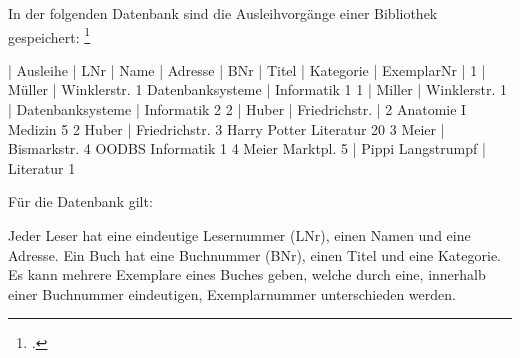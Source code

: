 \documentclass{bschlangaul-aufgabe}
\begin{document}

\let\ah=\bAttributHuelle
\let\ahL=\bLinksReduktion
\let\FA=\bFunktionaleAbhaengigkeiten
\let\fa=\bFunktionaleAbhaengigkeit
\let\m=\bAttributMenge
\let\schrittE=\bSyntheseUeberErklaerung

In der folgenden Datenbank sind die Ausleihvorgänge einer Bibliothek gespeichert:
\footcite{examen:66116:2017:03}

| Ausleihe | LNr | Name | Adresse | BNr | Titel | Kategorie | ExemplarNr |
1 | Müller | Winklerstr. 1 Datenbanksysteme | Informatik 1
1 | Miller | Winklerstr. 1 | Datenbanksysteme | Informatik 2
2 | Huber | Friedrichstr. | 2 Anatomie I Medizin 5
2 Huber | Friedrichstr. 3 Harry Potter Literatur 20
3 Meier | Bismarkstr. 4 OODBS Informatik 1
4 Meier Marktpl. 5 | Pippi Langstrumpf | Literatur 1

Für die Datenbank gilt:

Jeder Leser hat eine eindeutige Lesernummer (LNr), einen Namen und eine
Adresse. Ein Buch hat eine Buchnummer (BNr), einen Titel und eine
Kategorie. Es kann mehrere Exemplare eines Buches geben, welche durch
eine, innerhalb einer Buchnummer eindeutigen, Exemplarnummer
unterschieden werden.
\end{document}
